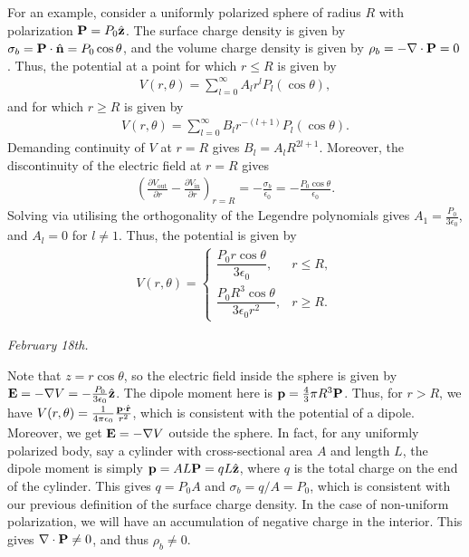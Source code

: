 For an example, consider a uniformly polarized sphere of radius $R$ with polarization $\mathbf{P} = P_{0} \hat{\mathbf{z}}$. The surface charge density is given by $\sigma_{b} = \mathbf{P} \cdot \hat{\mathbf{n}} = P_{0} \cos \theta$, and the volume charge density is given by $\rho_{b} = -\nabla \cdot \mathbf{P} = 0$. Thus, the potential at a point for which $r \leq R$ is given by
\begin{align}
    V(r,\theta) = \sum_{l=0}^{\infty} A_{l} r^{l} P_{l}(\cos \theta),
\end{align}
and for which $r \geq R$ is given by
\begin{align}
    V(r,\theta) = \sum_{l=0}^{\infty} B_{l} r^{-(l+1)} P_{l}(\cos \theta).
\end{align}
Demanding continuity of $V$ at $r = R$ gives $B_{l} = A_{l} R^{2l+1}$. Moreover, the discontinuity of the electric field at $r = R$ gives
\begin{align}
    \left( \frac{\partial V_{\text{out}}}{\partial r} - \frac{\partial V_{\text{in}}}{\partial r} \right)_{r=R} = -\frac{\sigma_{b}}{\epsilon_{0}} = -\frac{P_{0} \cos \theta}{\epsilon_{0}}.
\end{align}
Solving via utilising the orthogonality of the Legendre polynomials gives $A_{1} = \frac{P_{0}}{3 \epsilon_{0}}$, and $A_{l} = 0$ for $l \neq 1$. Thus, the potential is given by
\begin{align}
    V(r,\theta) = \begin{cases}
        \dfrac{P_{0} r \cos \theta}{3 \epsilon_{0}}, & r \leq R, \\
        \dfrac{P_{0} R^{3} \cos \theta}{3 \epsilon_{0} r^{2}}, & r \geq R.
    \end{cases}
\end{align}

\noindent \textit{February 18th.}

Note that $z = r \cos \theta$, so the electric field inside the sphere is given by $\mathbf{E} = -\nabla V = -\frac{P_{0}}{3 \epsilon_{0}} \hat{\mathbf{z}}$. The dipole moment here is $\mathbf{p} = \frac{4}{3} \pi R^{3} \mathbf{P}$. Thus, for $r > R$, we have $V(r,\theta) = \frac{1}{4 \pi \epsilon_{0}} \frac{\mathbf{p} \cdot \hat{\mathbf{r}}}{r^{2}}$, which is consistent with the potential of a dipole. Moreover, we get $\mathbf{E} = -\nabla V$ outside the sphere. In fact, for any uniformly polarized body, say a cylinder with cross-sectional area $A$ and length $L$, the dipole moment is simply $\mathbf{p} = AL\mathbf{P} = qL \hat{\mathbf{z}}$, where $q$ is the total charge on the end of the cylinder. This gives $q = P_{0}A$ and $\sigma_{b} = q/A = P_{0}$, which is consistent with our previous definition of the surface charge density. In the case of non-uniform polarization, we will have an accumulation of negative charge in the interior. This gives $\nabla \cdot \mathbf{P} \neq 0$, and thus $\rho_{b} \neq 0$.\\ \\

